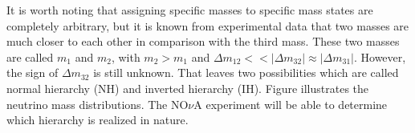 It is worth noting that assigning specific masses to specific mass states are completely 
arbitrary, but it is known from experimental data that two masses are much closer to each other 
in comparison with the third mass. These two masses are called $m_1$ and $m_2$, with $m_2 > m_1$ 
and $\Delta m_{12} << |\Delta m_{32}| \approx |\Delta m_{31}|$. However, the sign of $\Delta m_{32}$ 
is still unknown. That leaves two possibilities which are called normal hierarchy (NH) and inverted 
hierarchy (IH). Figure  illustrates the neutrino mass distributions. The NO$\nu$A experiment 
will be able to determine which hierarchy is realized in nature.


